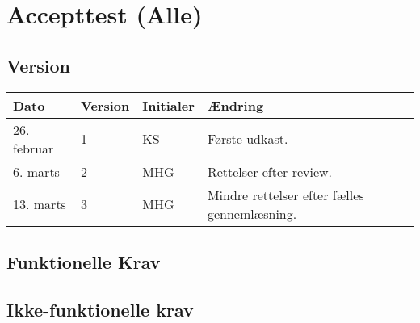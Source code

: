 \chapter{Accepttest (Alle)}
\section{Version}
\begin{table}[h]
	\centering
	\begin{tabularx}{\textwidth - 2cm}{|l|l|l|X|}
	\hline
	Dato	& Version	& Initialer & Ændring	\\ \hline
	26. februar & 1 & KS & Første udkast. \\ \hline
	6. marts & 2 & MHG & Rettelser efter review. \\ \hline
	13. marts & 3 & MHG & Mindre rettelser efter fælles gennemlæsning.\\\hline
	\end{tabularx}
\end{table}
\section{Funktionelle Krav}
\clearpage
{} 
\clearpage
{}
\clearpage
{}
\clearpage
{}
\clearpage
{}

\section{Ikke-funktionelle krav}

\clearpage